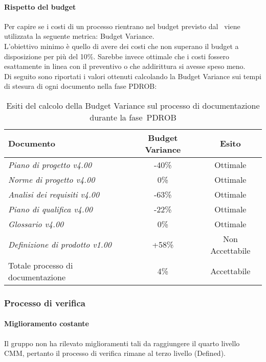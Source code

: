 \documentclass[../PianoDiQualifica.tex]{subfiles}
\begin{document}
\begin{appendices}
			\paragraph{Rispetto del budget}
			Per capire se i costi di un processo rientrano nel budget previsto dal \pianodiprogetto\ viene utilizzata la seguente metrica: Budget Variance.\\
			L'obiettivo minimo è quello di avere dei costi che non superano il budget a disposizione per più del 10\%. Sarebbe invece ottimale che i costi fossero esattamente in linea con il preventivo o che addirittura si avesse speso meno.\\
			Di seguito sono riportati i valori ottenuti calcolando la Budget Variance sui tempi di stesura di ogni documento nella fase PDROB:
			\begin{table}[H]
				\centering
				\begin{tabular}{l * {2}{c}}
					\toprule
					\textbf{Documento} & \textbf{Budget Variance} & \textbf{Esito} \\
					\midrule
					\textit{Piano di progetto v4.00} & -40\% &  Ottimale \\
					\textit{Norme di progetto v4.00} & 0\% & Ottimale \\
					\textit{Analisi dei requisiti v4.00} & -63\% & Ottimale \\
					\textit{Piano di qualifica v4.00} & -22\% & Ottimale \\
					\textit{Glossario v4.00} & 0\% & Ottimale \\
					\textit{Definizione di prodotto v1.00} & +58\% & Non Accettabile \\
					Totale processo di documentazione & 4\% & Accettabile \\
					\bottomrule
				\end{tabular}
				\caption{Esiti del calcolo della Budget Variance sul processo di documentazione durante la fase\g\ PDROB}
				\label{tab:esiti_budget_variance}
			\end{table}
						
		\subsubsection{Processo di verifica}
			\paragraph{Miglioramento costante}
			Il gruppo non ha rilevato miglioramenti tali da raggiungere il quarto livello CMM, pertanto il processo di verifica rimane al terzo livello (Defined).
			

\end{appendices}
\end{document}
